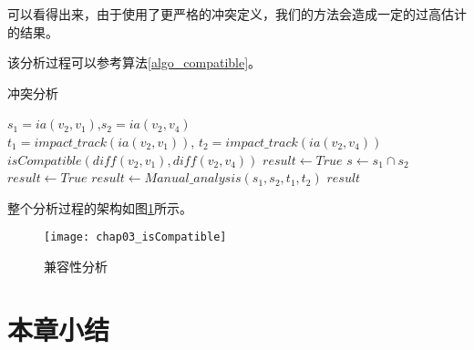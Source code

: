 可以看得出来，由于使用了更严格的冲突定义，我们的方法会造成一定的过高估计的结果。

该分析过程可以参考算法\ref {algo_compatible}。

\begin{algorithm}
	\caption{冲突分析}
	\label{algo_compatible}
	\begin{algorithmic}[1]
		\REQUIRE $s_1=ia(v_2,v_1)$,$s_2=ia(v_2,v_4)$\\
				 \quad \quad $t_1=impact\_track(ia(v_2,v_1))$, $t_2=impact\_track(ia(v_2,v_4))$
		\ENSURE $isCompatible(diff(v_2,v_1), diff(v_2,v_4))$
			\STATE $result \gets True$
		\ELSE
			\STATE $s \gets s_1 \cap s_2$
				\STATE $result \gets True$
			\ELSE				
				\STATE $result \gets Manual\_analysis(s_1, s_2, t_1, t_2)$
			\ENDIF 
		\ENDIF
		\RETURN $result$
	\end{algorithmic}
\end{algorithm}

整个分析过程的架构如图\ref {isCompatible}所示。

\begin{figure}[H]
	\centering
	\texttt{[image: chap03\_isCompatible]}
	\caption {兼容性分析}
	\label {isCompatible}	
\end{figure}


\section{本章小结}